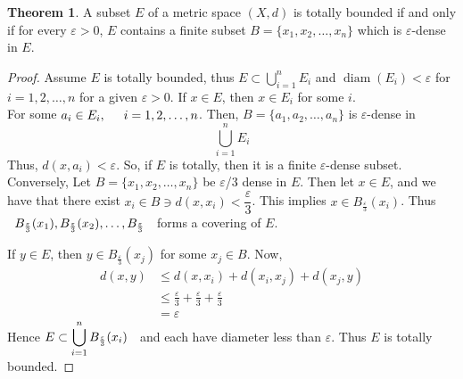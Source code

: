 \documentclass[11pt,a4paper]{article}
\theoremstyle{definition}
\newtheorem{thm}{Theorem}[section]
\DeclareMathOperator{\diam}{diam}
\begin{document}
\begin{thm}
A subset $E$ of a metric space $(X,d)$ is totally bounded if and only if for every $\varepsilon>0$, $E$ contains a finite subset $B=\{x_1,x_2,\dots,x_n\}$ which is $\varepsilon$-dense in $E$.


\pagebreak
\end{thm}
\begin{proof}
Assume $E$ is totally bounded, thus \hspace{0.2cm}$\displaystyle{ E\subset \bigcup^n_{i=1}E_i}$\hspace{0.2cm} and\hspace{0.2cm} $\diam(E_i)<\varepsilon$\hspace{0.2cm} for $i=1,2,\dots,n$ for a given $\varepsilon>0$. If $x\in E$, then $x\in E_i$ for some $i$.\\ For some $a_i\in E_i,\hspace{0.5cm} i=1,2,\dots,n$. Then, $B=\{a_1,a_2,\dots,a_n\}$ is $\varepsilon$-dense in $$\bigcup^n_{i=1}E_i$$ Thus, $d(x,a_i)<\varepsilon$. So, if $E$ is totally, then it is a finite $\varepsilon$-dense subset.\\ 
Conversely, Let $B=\{x_1,x_2,\dots,x_n\}$ be $\varepsilon$/3 dense in $E$. Then let $x\in E$, and we have that there exist $x_i\in B\ni d(x,x_i)<\dfrac{\varepsilon}{3}$. This implies $x\in B_{\frac{\varepsilon}{3}}(x_i)$. Thus \hspace{0.2cm}$\hspace{0.2cm} B_{\frac{\varepsilon}{3}}(x_1), B_{\frac{\varepsilon}{3}}(x_2),\dots,B_{\frac{\varepsilon}{3}}\hspace{0.2cm}$ forms a covering of $E$.

If $y\in E$, then $y\in B_{\frac{\varepsilon}{3}}(x_j)$ for some $x_j\in B$. Now,
\begin{align*}
d(x,y) &\leq d(x,x_i)+d(x_i,x_j)+d(x_j,y)\\
       &\leq \frac{\varepsilon}{3}+\frac{\varepsilon}{3}+\frac{\varepsilon}{3}\\
       &=\varepsilon
\end{align*}
Hence \hspace{0.2cm}$\displaystyle{ E\subset \bigcup^n_{i=1}B_{\frac{\varepsilon}{3}}(x_i)}\hspace{0.2cm}$ and each have diameter less than $\varepsilon$. Thus $E$ is totally bounded.

\end{proof}
\end{document}
